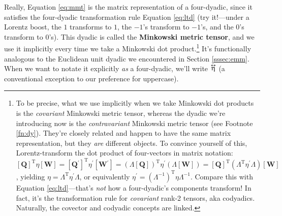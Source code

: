 \documentclass[12pt]{article}
\renewcommand{\vv}[1]{\mathbf{#1}}
\newcommand{\tightoverset}[2]{%
  \mathop{#2}\limits^{\vbox to -.5ex{\kern-0.75ex\hbox{$#1$}\vss}}}
\newcommand{\inlinedy}[1]{\tightoverset{\text{\tiny$\bm\leftrightarrow$}}{#1}}
\begin{document}
Really, Equation \ref{eq:mmt} is the matrix representation of a four-dyadic, since it satisfies the four-dyadic transformation rule Equation \ref{eq:ltd} (try it!---under a Lorentz boost, the $1$ transforms to $1$, the $-1$'s transform to $-1$'s, and the $0$'s transform to $0$'s). This dyadic is called the \textbf{Minkowski metric tensor}, and we use it implicitly every time we take a Minkowski dot product.\footnote{\label{fn:cov}To be precise, what we use implicitly when we take Minkowski dot products is the \emph{covariant} Minkowski metric tensor, whereas the dyadic we're introducing now is the \emph{contravariant} Minkowski metric tensor (see Footnote \ref{fn:dy}). They're closely related and happen to have the same matrix representation, but they \emph{are} different objects. To convince yourself of this, Lorentz-transform the dot product of four-vectors in matrix notation: $[ \vv Q ] ^\mathrm{T} \eta [ \vv W ] = [ \vv Q {}^\prime ] ^\mathrm{T} \eta ^\prime [ \vv W {}^\prime ] =  ( \Lambda [ \vv Q ] ) ^\mathrm{T} \eta ^\prime ( \Lambda [ \vv W ] ) = [ \vv Q ] ^\mathrm{T} ( \Lambda ^\mathrm{T} \eta^ \prime \Lambda ) [ \vv W ] $, yielding $ \eta = \Lambda ^\mathrm{T} \eta^ \prime \Lambda $, or equivalently $\eta ^\prime = ( \Lambda ^{-1} ) ^\mathrm{T} \eta \Lambda ^{-1} $. Compare this with Equation \ref{eq:ltd}---that's \emph{not} how a four-dyadic's components transform! In fact, it's the transformation rule for \emph{covariant} rank-2 tensors, aka codyadics. Naturally, the covector and codyadic concepts are linked.} It's functionally analogous to the Euclidean unit dyadic we encountered in Section \ref{sssec:emm}. When we want to notate it explicitly \emph{as} a four-dyadic, we'll write $\inlinedy{\upeta}$ (a conventional exception to our preference for uppercase).
\end{document}
